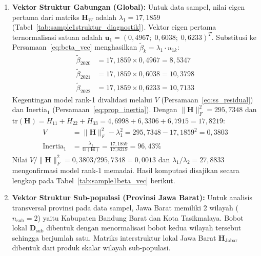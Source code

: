 \begin{enumerate}
    \item \textbf{Vektor Struktur Gabungan (Global):}
    Untuk data sampel, nilai eigen pertama dari matriks $\mathbf{H}_W$ adalah $\lambda_1 = 17{,}1859$ (Tabel~\ref{tab:sample1struktur_diagnostik}). Vektor eigen pertama ternormalisasi satuan adalah $\mathbf{u}_1 = (0{,}4967;\;0{,}6038;\;0{,}6233)^T$. Substitusi ke Persamaan~\ref{eq:beta_vec} menghasilkan $\tilde{\beta}_k = \lambda_1 \cdot u_{1k}$:
    \begin{align*}
        \tilde{\beta}_{2020} &= 17{,}1859 \times 0{,}4967 = 8{,}5347 \\
        \tilde{\beta}_{2021} &= 17{,}1859 \times 0{,}6038 = 10{,}3798 \\
        \tilde{\beta}_{2022} &= 17{,}1859 \times 0{,}6233 = 10{,}7133
    \end{align*}
    Kegentingan model rank-1 divalidasi melalui $V$ (Persamaan~\ref{eq:ss_residual}) dan Inertia$_1$ (Persamaan~\ref{eq:prop_inertia}). Dengan $\|\mathbf{H}\|_F^2 = 295{,}7348$ dan $\mathrm{tr}(\mathbf{H}) = H_{11}+H_{22}+H_{33} = 4{,}6998+6{,}3306+6{,}7915 = 17{,}8219$:
    \begin{align*}
      V &= \|\mathbf{H}\|_F^2 - \lambda_1^2 = 295{,}7348 - 17{,}1859^2 = 0{,}3803 \\
      \mathrm{Inertia}_1 &= \frac{\lambda_1}{\mathrm{tr}(\mathbf{H})} = \frac{17{,}1859}{17{,}8219} = 96{,}43\%
    \end{align*}
    Nilai $V/\|\mathbf{H}\|_F^2 = 0{,}3803/295{,}7348 = 0{,}0013$ dan $\lambda_1/\lambda_2 = 27{,}8833$ mengonfirmasi model rank-1 memadai.
    Hasil komputasi disajikan secara lengkap pada Tabel~\ref{tab:sample1beta_vec} berikut.
    
    
    \item \textbf{Vektor Struktur Sub-populasi (Provinsi Jawa Barat):}
    Untuk analisis transversal provinsi pada data sampel, Jawa Barat memiliki 2 wilayah ($n_{\text{sub}}=2$) yaitu Kabupaten Bandung Barat dan Kota Tasikmalaya. Bobot lokal $\mathbf{D}_{\text{sub}}$ dibentuk dengan menormalisasi bobot kedua wilayah tersebut sehingga berjumlah satu. Matriks interstruktur lokal Jawa Barat $\mathbf{H}_{\text{Jabar}}$ dibentuk dari produk skalar wilayah sub-populasi. 
    

\end{enumerate}
